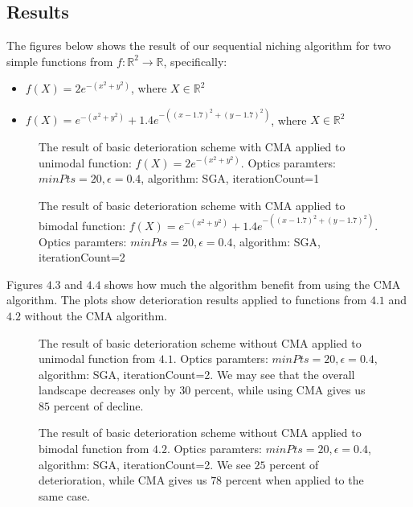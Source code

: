 \subsection{Results}

The figures below shows the result of our sequential niching algorithm for two
simple functions from $f:\mathbb{R}^2 \rightarrow \mathbb{R}$, specifically:
\begin{itemize}
  \item $f(X) = 2e^{-(x^2 + y^2)}$, where $X \in \mathbb{R}^2$
  \item $f(X) = e^{-(x^2 + y^2)}+1.4e^{-((x-1.7)^2 + (y-1.7)^2)}$, where $X \in
  \mathbb{R}^2$
\end{itemize}

\begin{figure}
  \centering
  \caption{The result of basic deterioration scheme with CMA 
  applied to unimodal function: $f(X) = 2e^{-(x^2 +y^2)}$.
  Optics paramters: $minPts=20, \epsilon=0.4$, algorithm: SGA, iterationCount=1}
  \label{det1}
\end{figure}

\begin{figure}
  \centering
  \caption{The result of basic deterioration scheme with CMA 
  applied to bimodal function: $f(X) = e^{-(x^2 + y^2)}+1.4e^{-((x-1.7)^2 +
  (y-1.7)^2)}$. Optics paramters: $minPts=20, \epsilon=0.4$, algorithm: SGA, iterationCount=2}
  \label{det2}
\end{figure}

Figures $4.3$ and $4.4$ shows how much the algorithm benefit from using
the CMA algorithm. The plots show deterioration results applied to
functions from $4.1$ and $4.2$ without the CMA algorithm.

\begin{figure}
  \centering
  \caption{The result of basic deterioration scheme without CMA 
  applied to unimodal function from $4.1$. Optics paramters: $minPts=20,
  \epsilon=0.4$, algorithm: SGA, iterationCount=2. We may see that the 
  overall landscape decreases only by $30$ percent, while using CMA
  gives us $85$ percent of decline.}
  \label{det3}
\end{figure}

\begin{figure}
  \centering
  \caption{The result of basic deterioration scheme without CMA 
  applied to bimodal function from $4.2$. Optics paramters: $minPts=20,
  \epsilon=0.4$, algorithm: SGA, iterationCount=2. We see $25$ percent
  of deterioration, while CMA gives us $78$ percent when applied to the same
  case.}
  \label{det3}
\end{figure}

